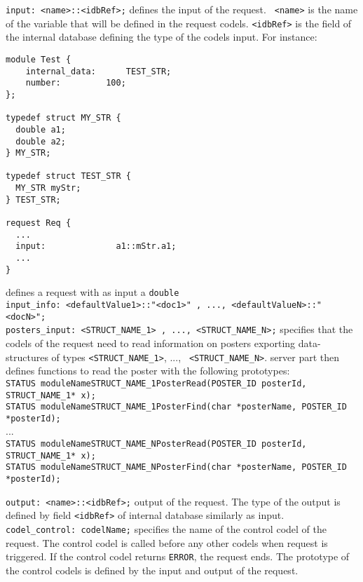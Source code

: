 \noindent
{\tt input: <name>::<idbRef>;} defines the input of the request. {\tt
  <name>} is the name of the variable that will be defined in the
request codels. {\tt <idbRef>} is the field of the internal database
defining the type of the codels input. For instance:\\
\begin{center}
\begin{verbatim}
module Test {
    internal_data:	    TEST_STR;
    number:		    100;
}; 

typedef struct MY_STR {
  double a1;
  double a2;
} MY_STR;

typedef struct TEST_STR {
  MY_STR myStr;
} TEST_STR;

request Req {
  ...
  input:              a1::mStr.a1;
  ...
}
\end{verbatim}
\end{center}
defines a request with as input a {\tt double}\\

\noindent
{\tt input\_info:  <defaultValue1>::"<doc1>" , ..., <defaultValueN>::"<docN>";} \\

\noindent
{\tt posters\_input:  <STRUCT\_NAME\_1> , ..., <STRUCT\_NAME\_N>;}
specifies that the codels of the request need to read information on posters exporting
data-structures of types {\tt <STRUCT\_NAME\_1>}, ..., {\tt
  <STRUCT\_NAME\_N>}. {\GenoM} server part then defines functions to read
the poster with the following prototypes:\\{\small
{\tt STATUS moduleNameSTRUCT\_NAME\_1PosterRead(POSTER\_ID posterId,
  STRUCT\_NAME\_1* x);}\\
{\tt STATUS moduleNameSTRUCT\_NAME\_1PosterFind(char *posterName,
  POSTER\_ID *posterId);}\\
...\\
{\tt STATUS moduleNameSTRUCT\_NAME\_NPosterRead(POSTER\_ID posterId,
  STRUCT\_NAME\_1* x);}\\
{\tt STATUS moduleNameSTRUCT\_NAME\_NPosterFind(char *posterName,
  POSTER\_ID *posterId);}\\
}

\noindent
{\tt output:  <name>::<idbRef>;} output of the request. The type of
the output is defined by field {\tt <idbRef>} of internal database
similarly as input.\\

\noindent
{\tt codel\_control: codelName;} specifies the name of the
control codel of the request. The control codel is called before
any other codels when request is triggered. If the control codel returns {\tt ERROR}, the
request ends. The prototype of the control codels is defined by the
input and output of the request.
\\

